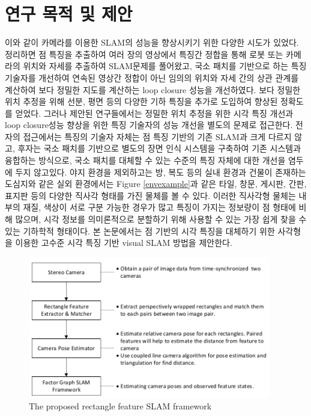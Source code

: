 \documentclass[master,korean,final]{cbnu-ecs}
\begin{document}
\section{연구 목적 및 제안}
이와 같이 카메라를 이용한 SLAM의 성능을 향상시키기 위한 다양한 시도가 있었다. 정리하면 점 특징을 추출하여 여러 장의 영상에서 특징간 정합을 통해 로봇 또는 카메라의 위치와 자세를 추출하여 SLAM문제를 풀어왔고, 국소 패치를 기반으로 하는 특징 기술자를 개선하여 연속된 영상간 정합이 아닌 임의의 위치와 자세 간의 상관 관계를 계산하여 보다 정밀한 지도를 계산하는 loop closure 성능을 개선하였다. 보다 정밀한 위치 추정을 위해 선분, 평면 등의 다양한 기하 특징을 추가로 도입하여 향상된 정확도를 얻었다.
그러나 제안된 연구들에서는 정밀한 위치 추정을 위한 시각 특징 개선과 loop closure성능 향상을 위한 특징 기술자의 성능 개선을 별도의 문제로 접근한다. 전자의 접근에서는 특징의 기술자 자체는 점 특징 기반의 기존 SLAM과 크게 다르지 않고, 후자는 국소 패치를 기반으로 별도의 장면 인식 시스템을 구축하여 기존 시스템과 융합하는 방식으로, 국소 패치를 대체할 수 있는 수준의 특징 자체에 대한 개선을 염두에 두지 않고있다. 
야지 환경을 제외하고는 방, 복도 등의 실내 환경과 건물이 존재하는 도심지와 같은 실외 환경에서는 Figure \ref{envexample}과 같은 타일, 창문, 게시판, 간판, 표지판 등의 다양한 직사각 형태를 가진 물체를 볼 수 있다. 이러한 직사각형 물체는 내부의 재질, 색상이 서로 구분 가능한 경우가 많고 특징이 가지는 정보량이 점 형태에 비해 많으며, 시각 정보를 의미론적으로 분할하기 위해 사용할 수 있는 가장 쉽게 찾을 수 있는 기하학적 형태이다. 본 논문에서는 점 기반의 시각 특징을 대체하기 위한 사각형을 이용한 고수준 시각 특징 기반 visual SLAM 방법을 제안한다.
\begin{figure}[!ht]
  \centering
	\includegraphics[width=400px]{img/Rectangle_feature_SLAM_framework_cropped.pdf}
  \caption{The proposed rectangle feature SLAM framework}
\label{rectSLAM_framework}
\end{figure}
\end{document}
